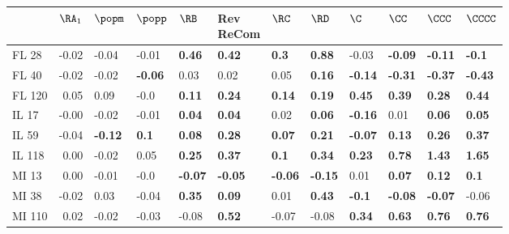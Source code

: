 \begin{tabular}{lrllllllllll}
\toprule
{} &  $\RA_1$ &         $\popm$ &         $\popp$ &           $\RB$ & \makecell{Rev \\ ReCom} &           $\RC$ &           $\RD$ &            $\C$ &           $\CC$ &          $\CCC$ &         $\CCCC$ \\
\midrule
FL 28   &    -0.02 &           -0.04 &           -0.01 &   \textbf{0.46} &           \textbf{0.42} &    \textbf{0.3} &   \textbf{0.88} &           -0.03 &  \textbf{-0.09} &  \textbf{-0.11} &   \textbf{-0.1} \\
FL 40   &    -0.02 &           -0.02 &  \textbf{-0.06} &            0.03 &                    0.02 &            0.05 &   \textbf{0.16} &  \textbf{-0.14} &  \textbf{-0.31} &  \textbf{-0.37} &  \textbf{-0.43} \\
FL 120  &     0.05 &            0.09 &            -0.0 &   \textbf{0.11} &           \textbf{0.24} &   \textbf{0.14} &   \textbf{0.19} &   \textbf{0.45} &   \textbf{0.39} &   \textbf{0.28} &   \textbf{0.44} \\
IL 17   &    -0.00 &           -0.02 &           -0.01 &   \textbf{0.04} &           \textbf{0.04} &            0.02 &   \textbf{0.06} &  \textbf{-0.16} &            0.01 &   \textbf{0.06} &   \textbf{0.05} \\
IL 59   &    -0.04 &  \textbf{-0.12} &    \textbf{0.1} &   \textbf{0.08} &           \textbf{0.28} &   \textbf{0.07} &   \textbf{0.21} &  \textbf{-0.07} &   \textbf{0.13} &   \textbf{0.26} &   \textbf{0.37} \\
IL 118  &     0.00 &           -0.02 &            0.05 &   \textbf{0.25} &           \textbf{0.37} &    \textbf{0.1} &   \textbf{0.34} &   \textbf{0.23} &   \textbf{0.78} &   \textbf{1.43} &   \textbf{1.65} \\
MI 13   &     0.00 &           -0.01 &            -0.0 &  \textbf{-0.07} &          \textbf{-0.05} &  \textbf{-0.06} &  \textbf{-0.15} &            0.01 &   \textbf{0.07} &   \textbf{0.12} &    \textbf{0.1} \\
MI 38   &    -0.02 &            0.03 &           -0.04 &   \textbf{0.35} &           \textbf{0.09} &            0.01 &   \textbf{0.43} &   \textbf{-0.1} &  \textbf{-0.08} &  \textbf{-0.07} &           -0.06 \\
MI 110  &     0.02 &           -0.02 &           -0.03 &           -0.08 &           \textbf{0.52} &           -0.07 &           -0.08 &   \textbf{0.34} &   \textbf{0.63} &   \textbf{0.76} &   \textbf{0.76} \\

\end{tabular}
